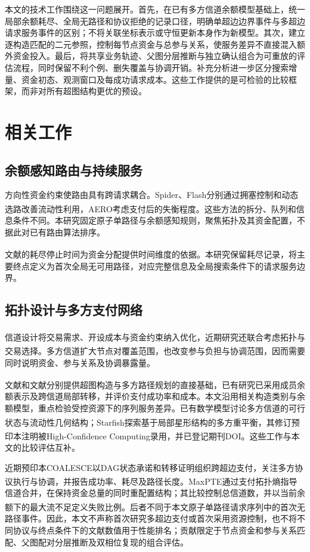 \documentclass[UTF8,a4paper,twocolumn,fontset=none,zihao=5]{ctexart}
\newcommand{\upcite}[1]{\textsuperscript{\cite{#1}}}
\begin{document}
本文的技术工作围绕这一问题展开。首先，在已有多方信道余额模型基础上，统一局部余额耗尽、全局无路径和协议拒绝的记录口径，明确单超边边界事件与多超边请求服务事件的区别；不将关联坐标表示或守恒更新本身作为新模型。其次，建立逐构造匹配的二元参照，控制每节点资金与总参与关系，使服务差异不直接混入额外资金投入。最后，将共享业务轨迹、父图分层推断与独立确认组合为可重放的评估流程，同时保留不利个例、删失覆盖与协调开销。补充分析进一步区分搜索增量、资金初态、观测窗口及每成功请求成本。这些工作提供的是可检验的比较框架，而非对所有超图结构更优的预设。


\section{相关工作}

\subsection{余额感知路由与持续服务}

方向性资金约束使路由具有跨请求耦合。Spider、Flash分别通过拥塞控制和动态选路改善流动性利用\upcite{r3,r4}，AERO考虑支付后的失衡程度\upcite{r12}。这些方法的拆分、队列和信息条件不同。本研究固定原子单路径与余额感知规则，聚焦拓扑及其资金配置，不据此对已有路由算法排序。


文献\upcite{r9}的耗尽停止时间为资金分配提供时间维度的依据。本研究保留耗尽记录，将主要终点定义为首次全局无可用路径，对应完整信息及全局搜索条件下的请求服务边界。


\subsection{拓扑设计与多方支付网络}

信道设计将交易需求、开设成本与资金约束纳入优化\upcite{r6,r7,r8}，近期研究还联合考虑拓扑与交易选择\upcite{r13}。多方信道扩大节点对覆盖范围，也改变参与负担与协调范围\upcite{r10}，因而需要同时说明资金、参与关系及协调暴露量。


文献\upcite{r10}和文献\upcite{r11}分别提供超图构造与多方路径规划的直接基础，已有研究已采用成员余额表示及跨信道局部转移，并评价支付成功率和成本。本文沿用相关构造类别与余额模型，重点检验受控资源下的序列服务差异。已有数学模型讨论多方信道的可行状态与流动性几何结构\upcite{r14}；Starfish探索基于局部星形结构的多方重平衡，其修订预印本注明被High-Confidence Computing录用，并已登记期刊DOI\upcite{r15}。这些工作与本文的比较评估互补。

近期预印本COALESCE以DAG状态承诺和转移证明组织跨超边支付，关注多方协议执行与协调，并报告成功率、耗尽及路径长度\upcite{r16}。MaxPTE通过支付拓扑熵指导信道合并，在保持资金总量的同时重配置结构；其比较控制总信道数，并以当前余额下的最大流不足定义失败比例\upcite{r17}。后者不同于本文原子单路径请求序列中的首次无路径事件。因此，本文不声称首次研究多超边支付或首次采用资源控制，也不将不同协议与终点条件下的文献数值用于性能排名；贡献限定于节点资金和参与关系匹配、父图配对分层推断及双相位复现的组合评估。
\end{document}
